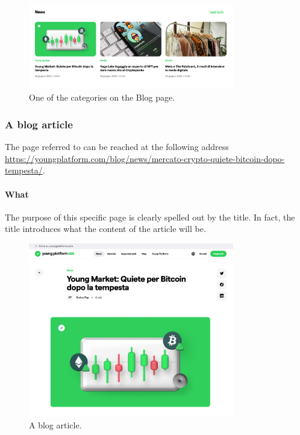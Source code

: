 \begin{figure}[H]
  \centering
  \includegraphics[width=0.80\textwidth]{res/images/internal-pages/blog/blog-2.png}
  \caption{One of the categories on the Blog page.}
  \label{fig:blog-2}
\end{figure}

\subsubsection{A blog article}

The page referred to can be reached at the following address \\
\href{https://youngplatform.com/blog/news/mercato-crypto-quiete-bitcoin-dopo-tempesta/}{https://youngplatform.com/blog/news/mercato-crypto-quiete-bitcoin-dopo-tempesta/}.

\paragraph{What}

The purpose of this specific page is clearly spelled out by the title. In 
fact, the title introduces what the content of the article will be.

\begin{figure}[H]
  \centering
  \includegraphics[width=0.80\textwidth]{res/images/internal-pages/blog/blog-3.png}
  \caption{A blog article.}
  \label{fig:blog-3}
\end{figure}

